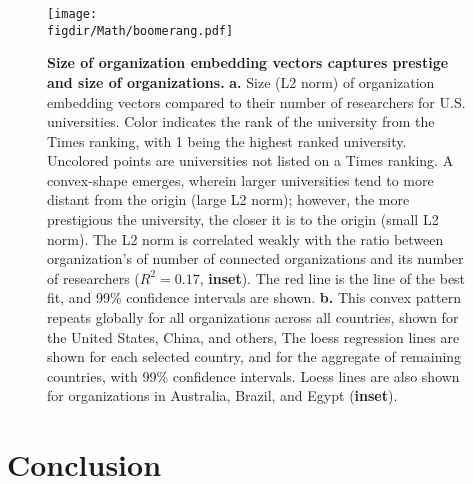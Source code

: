 \documentclass[12pt]{article} %
\def\figdir{../Figs}
\begin{document}
%
%
\begin{figure}[h!]
	\centering
	\texttt{[image: \\figdir/Math/boomerang.pdf]}
	\caption{
		\textbf{Size of organization embedding vectors captures prestige and size of organizations.}
		\textbf{a.} Size (L2 norm) of organization embedding vectors compared to their number of researchers for U.S. universities.
		Color indicates the rank of the university from the Times ranking, with 1 being the highest ranked university.
		Uncolored points are universities not listed on a Times ranking.
		A convex-shape emerges, wherein larger universities tend to more distant from the origin (large L2 norm); however, the more prestigious the university, the closer it is to the origin (small L2 norm).
		The L2 norm is correlated weakly with the ratio between organization's of number of connected organizations and its number of researchers ($R^{2} = 0.17$, \textbf{inset}).
		The red line is the line of the best fit, and 99\% confidence intervals are shown.
		\textbf{b.} This convex pattern repeats globally for all organizations across all countries, shown for the United States, China, and others,
		The loess regression lines are shown for each selected country, and for the aggregate of remaining countries, with 99\% confidence intervals.
		Loess lines are also shown for organizations in Australia, Brazil, and Egypt (\textbf{inset}).
	}
	\label{fig:length}
\end{figure}


%
%
\section*{Conclusion}
\end{document}
